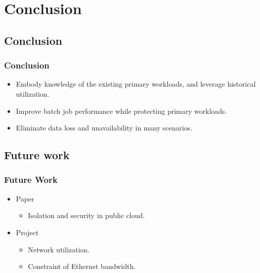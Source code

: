 \documentclass{beamer}
\begin{document}
\section{Conclusion}

\subsection{Conclusion}
	\begin{frame}
	\frametitle{Conclusion}
		\begin{itemize}
		\item Embody knowledge of the existing primary workloads, and leverage historical utilization.
		\item Improve batch job performance while protecting primary workloads.
		\item Eliminate data loss and unavailability in many scenarios.
		\end{itemize}
	\end{frame}

\subsection{Future work}
	\begin{frame}
	\frametitle{Future Work}
		\begin{itemize}
		\item Paper
			\begin{itemize}
			\item Isolation and security in public cloud.
			\end{itemize}
		\item Project
			\begin{itemize}
			\item Network utilization.
			\item Constraint of Ethernet bandwidth.
			\end{itemize}
		\end{itemize}
	\end{frame}
\end{document}
